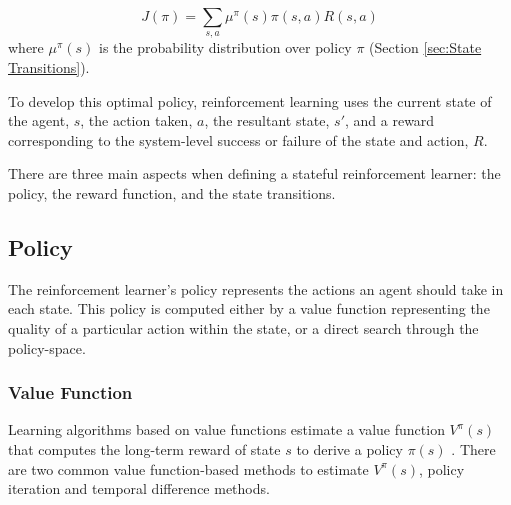 \documentclass{article}
\begin{document}
\begin{equation}
J(\pi) = \sum_{s,a}\mu^{\pi}(s)\pi(s,a)R(s,a)
\end{equation}
where $\mu^{\pi}(s)$ is the probability distribution over policy $\pi$ (Section \ref{sec:State Transitions}).

To develop this optimal policy, reinforcement learning uses the current state of the agent, $s$, the action taken, $a$, the resultant state, $s'$, and a reward corresponding to the system-level success or failure of the state and action, $R$.


There are three main aspects when defining a stateful reinforcement learner: the policy, the reward function, and the state transitions. 

\subsection{Policy}
The reinforcement learner's policy represents the actions an agent should take in each state. This policy is computed either by a value function representing the quality of a particular action within the state, or a direct search through the policy-space.

\subsubsection{Value Function}

Learning algorithms based on value functions estimate a value function $V^\pi(s)$ that computes the long-term reward of state $s$ to derive a policy $\pi(s)$ \cite{Kalyanakrishnan:2009:EAV:1558109.1558115}. There are two common value function-based methods to estimate $V^\pi(s)$, policy iteration and temporal difference methods.
\end{document}
